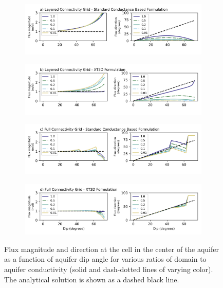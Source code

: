 \documentclass{article}
\begin{document}
\begin{figure}[p!]
\centering
\begin{subfigure}{0.9\textwidth}
	\includegraphics[width=\textwidth]{../figures/fig4_0_paper.png}
\end{subfigure}
\begin{subfigure}{0.9\textwidth}
	\includegraphics[width=\textwidth]{../figures/fig4_1_paper.png}
\end{subfigure}
\begin{subfigure}{0.9\textwidth}
	\includegraphics[width=\textwidth]{../figures/fig4_2_paper.png}
\end{subfigure}
\begin{subfigure}{0.9\textwidth}
	\includegraphics[width=\textwidth]{../figures/fig4_3_paper.png}
\end{subfigure}

\caption{Flux magnitude and direction at the cell in the center of the aquifer as a function of aquifer dip angle for various ratios of domain to aquifer conductivity (solid and dash-dotted lines of varying color). The analytical solution is shown as a dashed black line.}
\label{fig:fig4}
\end{figure}
\end{document}
